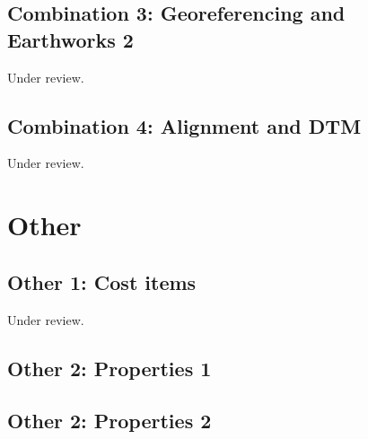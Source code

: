 \documentclass{scrartcl}
\begin{document}
\subsection{Combination 3: Georeferencing and Earthworks 2} %
\label{sec:georef_earth_2}
Under review.%
\clearpage

\subsection{Combination 4: Alignment and DTM}
\label{sec:align_dtm_2}
Under review.%
\clearpage

\section{Other}

\subsection{Other 1: Cost items} %
\label{sec:other_1}
Under review.%
\clearpage

\subsection{Other 2: Properties 1} %
\label{sec:other_2}
\clearpage

\subsection{Other 2: Properties 2} %
\label{sec:other_3}
\clearpage
\end{document}
